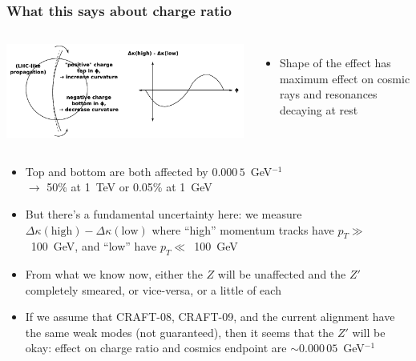 \documentclass[compress]{beamer}
\begin{document}
\begin{frame}
\frametitle{{\large What this says about charge ratio}}

\begin{columns}
\includegraphics[width=\linewidth]{impact_on_charge_ratio.pdf}

\begin{itemize}
\item Shape of the effect has maximum effect on cosmic rays and resonances decaying at rest
\end{itemize}
\end{columns}

\begin{itemize}
\item Top and bottom are both affected by $0.000\,5$~GeV$^{-1}$ \\ $\to$ 50\% at 1~TeV or 0.05\% at 1~GeV

\item But there's a fundamental uncertainty here: we measure
  $\Delta \kappa(\mbox{high}) - \Delta \kappa(\mbox{low})$ where ``high''
  momentum tracks have \mbox{$p_T \gg$ 100~GeV,} and ``low'' have \mbox{$p_T \ll$ 100~GeV}

\item From what we know now, either the $Z$ will be unaffected and the
  $Z'$ completely smeared, or vice-versa, or a little of each

\item If we assume that CRAFT-08, CRAFT-09, and the current alignment
  have the same weak modes (not guaranteed), then it seems that the
  $Z'$ will be okay: effect on charge ratio and cosmics endpoint are
  $\sim0.000\,05$~GeV$^{-1}$
\end{itemize}
\end{frame}
\end{document}

